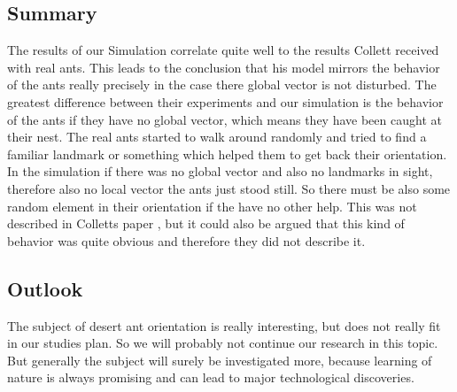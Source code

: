 \documentclass[11pt]{article}
\begin{document}
	\subsection{Summary}
		The results of our Simulation correlate quite well to the results Collett received with real ants. This leads to the conclusion that his model mirrors the behavior of the ants really precisely in the case there global vector is not disturbed. The greatest difference between their experiments and our simulation is the behavior of the ants if they have no global vector, which means they have been caught at their nest. The real ants started to walk around randomly and tried to find a familiar landmark or something which helped them to get back their orientation. In the simulation if there was no global vector and also no landmarks in sight, therefore also no local vector the ants just stood still. So there must be also some random element in their orientation if the have no other help. This was not described in Colletts paper \cite{wehner}, but it could also be argued that this kind of behavior was quite obvious and therefore they did not describe it.
	\subsection{Outlook}
		The subject of desert ant orientation is really interesting, but does not really fit in our studies plan. So we will probably not continue our research in this topic. But generally the subject will surely be investigated more, because learning of nature is always promising and can lead to major technological discoveries.

\end{document}
